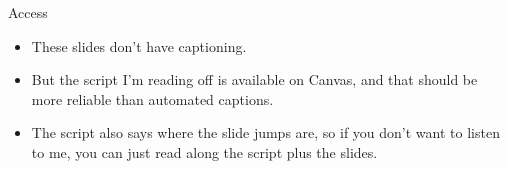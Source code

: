 \documentclass[
  ignorenonframetext,
]{beamer}
\providecommand{\tightlist}{%
  \setlength{\itemsep}{0pt}\setlength{\parskip}{0pt}}
\renewcommand{\,}{\text{, }}
\begin{document}
\begin{frame}{Access}
\protect\hypertarget{access}{}

\begin{itemize}
\tightlist
\item
  These slides don't have captioning.
\item
  But the script I'm reading off is available on Canvas, and that should
  be more reliable than automated captions.
\item
  The script also says where the slide jumps are, so if you don't want
  to listen to me, you can just read along the script plus the slides.
\end{itemize}

\end{frame}
\end{document}
